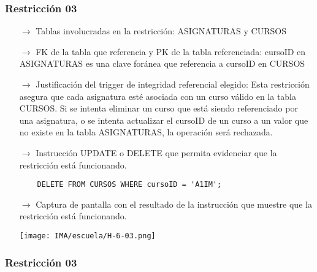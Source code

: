 \subsubsection*{Restricción 03}

\begin{itemize}
  \item[$\rightarrow$] Tablas involucradas en la restricción: ASIGNATURAS y CURSOS
  \item[$\rightarrow$] FK de la tabla que referencia y PK de la tabla referenciada: cursoID en ASIGNATURAS es una clave foránea que referencia a cursoID en CURSOS
  \item[$\rightarrow$] Justificación del trigger de integridad referencial elegido: Esta restricción asegura que cada asignatura esté asociada con un curso válido en la tabla CURSOS. Si se intenta eliminar un curso que está siendo referenciado por una asignatura, o se intenta actualizar el cursoID de un curso a un valor que no existe en la tabla ASIGNATURAS, la operación será rechazada.
  \item[$\rightarrow$] Instrucción UPDATE o DELETE que permita evidenciar que la restricción está funcionando.
  \begin{verbatim}
    DELETE FROM CURSOS WHERE cursoID = 'A1IM';
  \end{verbatim}
  \item[$\rightarrow$] Captura de pantalla con el resultado de la instrucción que muestre que la restricción está funcionando.
  \begin{center}
    \texttt{[image: IMA/escuela/H-6-03.png]}
  \end{center}
\end{itemize}


\subsubsection*{Restricción 03}

